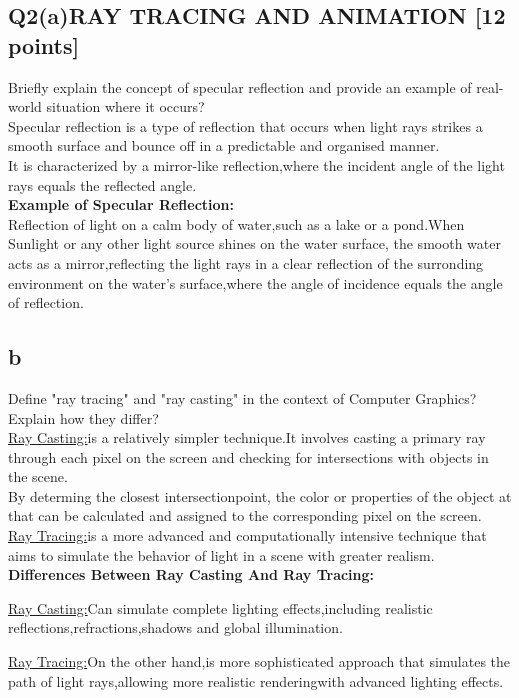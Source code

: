 \documentclass{article}
\begin{document}
\subsection{Q2(a)RAY TRACING AND ANIMATION [12 points]}Briefly explain the concept of specular reflection and provide an example of real-world situation where it occurs?\\
Specular reflection is a type of reflection that occurs when light rays strikes a smooth surface and bounce off in a predictable and organised manner.\\
It is characterized by a mirror-like reflection,where the incident angle of the light rays equals the reflected angle.\\
\textbf{Example of Specular Reflection:}\\
Reflection of light on a calm body of water,such as a lake or a pond.When Sunlight or any other light source shines on the water surface, the smooth water acts as a mirror,reflecting the light rays in a clear reflection of the surronding environment on the water's surface,where the angle of incidence equals the angle of reflection.

\subsection{b}Define "ray tracing" and "ray casting" in the context of Computer Graphics?\\ Explain how they differ?\\
\underline{Ray Casting:}is a relatively simpler technique.It involves casting a primary ray through each pixel on the screen and checking for intersections with objects in the scene.\\
By determing the closest intersectionpoint, the color or properties of the object at that can be calculated and assigned to the corresponding pixel on the screen.\\
\underline{Ray Tracing:}is a more advanced and computationally intensive technique that aims to simulate the behavior of light in a scene with greater realism.\\
\textbf{Differences Between Ray Casting And Ray Tracing:}\par
\underline{Ray Casting:}Can simulate complete lighting effects,including realistic reflections,refractions,shadows and global illumination.\par
\underline{Ray Tracing:}On the other hand,is more sophisticated approach that simulates the path of light rays,allowing more realistic renderingwith advanced lighting effects.  
\end{document}
